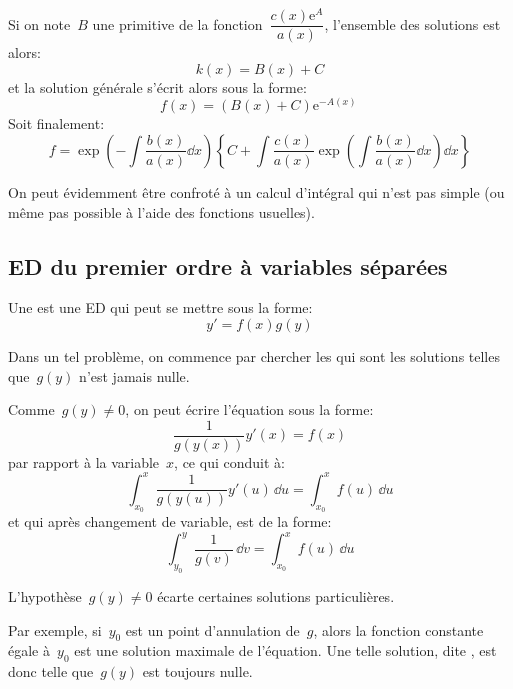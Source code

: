 Si on note~$B$ une primitive de la fonction~$\dfrac{c(x) \mathrm{e}^A}{a(x)}$, l'ensemble des solutions est alors:
\begin{equation}
  k(x) = B(x) + C
\end{equation}
et la solution générale s'écrit alors sous la forme:
\begin{equation}
  f(x) = (B(x) + C) \mathrm{e}^{-A(x)}\,
\end{equation}
Soit finalement:
\begin{equation}
  f = \exp\left( -\int\frac{b(x)}{a(x)}\dd x \right) \left\{ C + \int \frac{c(x)}{a(x)} \exp\left(\int \frac{b(x)}{a(x)}\dd x\right)\dd x \right\}
\end{equation}

On peut évidemment être confroté à un calcul d'intégral qui n'est pas simple
(ou même pas possible à l'aide des fonctions usuelles).



\medskip
\subsection{ED du premier ordre à variables séparées}

Une  est une 
ED qui peut se mettre sous la forme:
\begin{equation}
  y' = f(x)g(y)
\end{equation}

\medskip
Dans un tel problème, on commence par chercher les 
qui sont les solutions telles que~$g(y)$ n'est jamais nulle. 

Comme~$g(y)\ne0$, on peut écrire l'équation sous la forme:
\begin{equation}
  \frac{1}{g(y(x))} y'(x) = f(x)
\end{equation}
par rapport à la variable~$x$, ce qui conduit à:
\begin{equation}
  \int_{x_0}^x \frac{1}{g(y(u))}y'(u) \, \dd u = \int_{x_0}^x f(u) \, \dd u 
\end{equation}
et qui après changement de variable, est de la forme:
\begin{equation}
  \int_{y_0}^y \frac{1}{g(v)} \, \dd v = \int_{x_0}^x f(u) \, \dd u 
\end{equation}

\medskip
L'hypothèse~$g(y)\ne0$ écarte certaines solutions particulières.

Par exemple, si~$y_0$ est un point d'annulation de~$g$, alors la fonction constante 
égale à~$y_0$ est une solution maximale de l'équation.
Une telle solution, dite , est donc telle que~$g(y)$ est toujours nulle.

